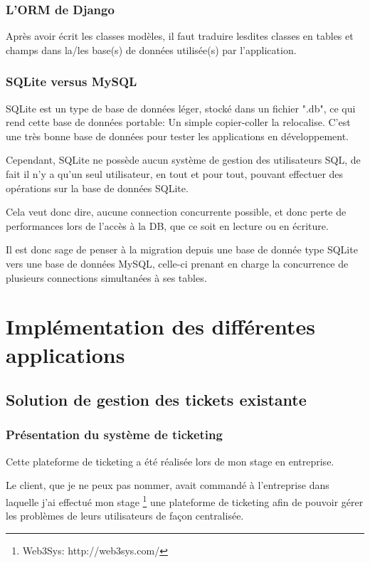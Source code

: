 \documentclass[12pt,table,a4paper]{report}
\begin{document}
\subsection{L'ORM de Django}
Après avoir écrit les classes modèles, il faut traduire lesdites classes en tables et champs dans la/les base(s) de données utilisée(s) par l'application.

\subsection{SQLite versus MySQL}
SQLite est un type de base de données léger, stocké dans un fichier ".db", ce qui rend cette base de données portable: Un simple copier-coller la relocalise. C'est une très bonne base de données pour tester les applications en développement.

Cependant, SQLite ne possède aucun système de gestion des utilisateurs SQL, de fait il n'y a qu'un seul utilisateur, en tout et pour tout, pouvant effectuer des opérations sur la base de données SQLite.

Cela veut donc dire, aucune connection concurrente possible, et donc perte de performances lors de l'accès à la DB, que ce soit en lecture ou en écriture.

Il est donc sage de penser à la migration depuis une base de donnée type SQLite vers une base de données MySQL, celle-ci prenant en charge la concurrence de plusieurs connections simultanées à ses tables.


\chapter{Implémentation des différentes applications}

\section{Solution de gestion des tickets existante}

\subsection{Présentation du système de ticketing}
Cette plateforme de ticketing a été réalisée lors de mon stage en entreprise.

Le client, que je ne peux pas nommer, avait commandé à l'entreprise dans laquelle j'ai effectué mon stage \footnote{Web3Sys: http://web3sys.com/} une plateforme de ticketing afin de pouvoir gérer les problèmes de leurs utilisateurs de façon centralisée.
\end{document}

